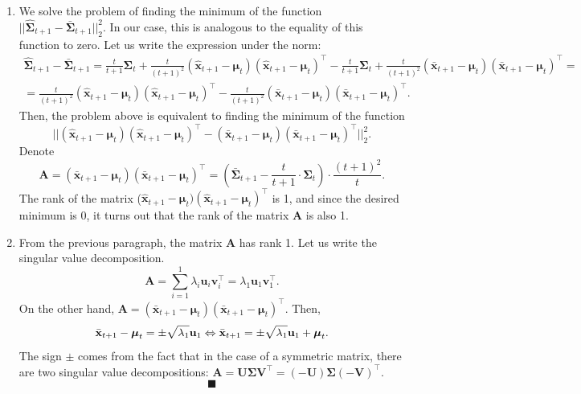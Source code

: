 \documentclass{article}
\begin{document}
{\begin{enumerate}
	\item We solve the problem of finding the minimum of the function $||\hat{\mathbf{\Sigma}}_{t+1} - \bar{\mathbf{\Sigma}}_{t+1}||_2^2$. In our case, this is analogous to the equality of this function to zero. Let us write the expression under the norm:
	\begin{gather*}
		\hat{\mathbf{\Sigma}}_{t+1} - \bar{\mathbf{\Sigma}}_{t+1} = \frac{t}{t+1}\mathbf{\Sigma}_t + \frac{t}{(t+1)^2}(\hat{\mathbf{x}}_{t+1}-\boldsymbol{\mu}_t)(\hat{\mathbf{x}}_{t+1}-\boldsymbol{\mu}_t)^\intercal - \frac{t}{t+1}\mathbf{\Sigma}_t + \frac{t}{(t+1)^2}(\bar{\mathbf{x}}_{t+1}-\boldsymbol{\mu}_t)(\bar{\mathbf{x}}_{t+1}-\boldsymbol{\mu}_t)^\intercal =\\
		=\frac{t}{(t+1)^2}(\hat{\mathbf{x}}_{t+1}-\boldsymbol{\mu}_t)(\hat{\mathbf{x}}_{t+1}-\boldsymbol{\mu}_t)^\intercal -\frac{t}{(t+1)^2}(\bar{\mathbf{x}}_{t+1}-\boldsymbol{\mu}_t)(\bar{\mathbf{x}}_{t+1}-\boldsymbol{\mu}_t)^\intercal.
 	\end{gather*}
 	Then, the problem above is equivalent to finding the minimum of the function \[||(\hat{\mathbf{x}}_{t+1}-\boldsymbol{\mu}_t)(\hat{\mathbf{x}}_{t+1}-\boldsymbol{\mu}_t)^\intercal-(\bar{\mathbf{x}}_{t+1}-\boldsymbol{\mu}_t)(\bar{\mathbf{x}}_{t+1}-\boldsymbol{\mu}_t)^\intercal||_2^2.\]
 	Denote \[\mathbf{A} = (\bar{\mathbf{x}}_{t+1}-\boldsymbol{\mu}_t)(\bar{\mathbf{x}}_{t+1}-\boldsymbol{\mu}_t)^\intercal = \left(\bar{\mathbf{\Sigma}}_{t+1} - \frac{t}{t+1} \cdot \mathbf{\Sigma}_t \right) \cdot \frac{(t+1)^2}{t}.\]
 	The rank of the matrix ($\hat{\mathbf{x}}_{t+1}-\boldsymbol{\mu}_t)(\hat{\mathbf{x}}_{t+1}-\boldsymbol{\mu}_t)^\intercal$ is 1, and since the desired minimum is 0, it turns out that the rank of the matrix $\mathbf{A}$ is also 1.
 	
 	\item From the previous paragraph, the matrix $\mathbf{A}$ has rank 1. Let us write the singular value decomposition. \[
 		\mathbf{A} = \sum_{i=1}^{1} \lambda_i \mathbf{u}_i \mathbf{v}_i^\intercal = \lambda_1 \mathbf{u}_1 \mathbf{v}_1^\intercal.
 	\]
 	On the other hand, $\mathbf{A} = (\bar{\mathbf{x}}_{t+1}-\boldsymbol{\mu}_t)(\bar{\mathbf{x}}_{t+1}-\boldsymbol{\mu}_t)^\intercal$. Then, \[
 	\bar{\mathbf{x}}_{t+1}-\boldsymbol{\mu}_t = \pm\sqrt{\lambda_1} \mathbf{u}_1 \Leftrightarrow\\
 	\bar{\mathbf{x}}_{t+1} = \pm\sqrt{\lambda_1} \mathbf{u}_1 + \boldsymbol{\mu}_t.
 	\]
 	The sign $\pm$ comes from the fact that in the case of a symmetric matrix, there are two singular value decompositions: $\mathbf{A}=\mathbf{U}\mathbf{\Sigma} \mathbf{V}^\intercal=(-\mathbf{U})\mathbf{\Sigma} (-\mathbf{V})^\intercal$.
 	$$ \blacksquare $$
\end{enumerate}

}
\end{document}
